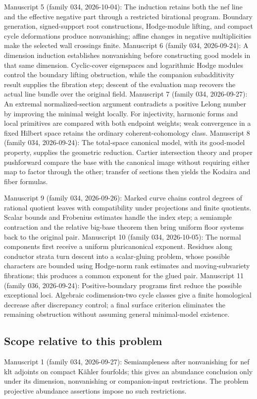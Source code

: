 \documentclass[11pt]{article}
\begin{document}
Manuscript 5 (family 034, 2026-10-04): The induction retains both the nef line and the effective negative part through a restricted birational program. Boundary generation, signed-support root constructions, Hodge-module lifting, and compact cycle deformations produce nonvanishing; affine changes in negative multiplicities make the selected wall crossings finite. Manuscript 6 (family 034, 2026-09-24): A dimension induction establishes nonvanishing before constructing good models in that same dimension. Cyclic-cover eigenspaces and logarithmic Hodge modules control the boundary lifting obstruction, while the companion subadditivity result supplies the fibration step; descent of the evaluation map recovers the actual line bundle over the original field. Manuscript 7 (family 034, 2026-09-27): An extremal normalized-section argument contradicts a positive Lelong number by improving the minimal weight locally. For injectivity, harmonic forms and local primitives are compared with both endpoint weights; weak convergence in a fixed Hilbert space retains the ordinary coherent-cohomology class. Manuscript 8 (family 034, 2026-09-24): The total-space canonical model, with its good-model property, supplies the geometric reduction. Cartier intersection theory and proper pushforward compare the base with the canonical image without requiring either map to factor through the other; transfer of sections then yields the Kodaira and fiber formulas.

Manuscript 9 (family 034, 2026-09-26): Marked curve chains control degrees of rational quotient leaves with compatibility under projections and finite quotients. Scalar bounds and Frobenius estimates handle the index step; a semiample contraction and the relative big-base theorem then bring uniform floor systems back to the original pair. Manuscript 10 (family 034, 2026-10-05): The normal components first receive a uniform pluricanonical exponent. Residues along conductor strata turn descent into a scalar-gluing problem, whose possible characters are bounded using Hodge-norm rank estimates and moving-subvariety fibrations; this produces a common exponent for the glued pair. Manuscript 11 (family 036, 2026-09-24): Positive-boundary programs first reduce the possible exceptional loci. Algebraic codimension-two cycle classes give a finite homological decrease after discrepancy control; a final surface criterion eliminates the remaining obstruction without assuming general minimal-model existence.

\subsection{Scope relative to this problem}
Manuscript 1 (family 034, 2026-09-27): Semiampleness after nonvanishing for nef klt adjoints on compact Kähler fourfolds; this gives an abundance conclusion only under its dimension, nonvanishing or companion-input restrictions. The problem projective abundance assertions impose no such restrictions.
\end{document}
